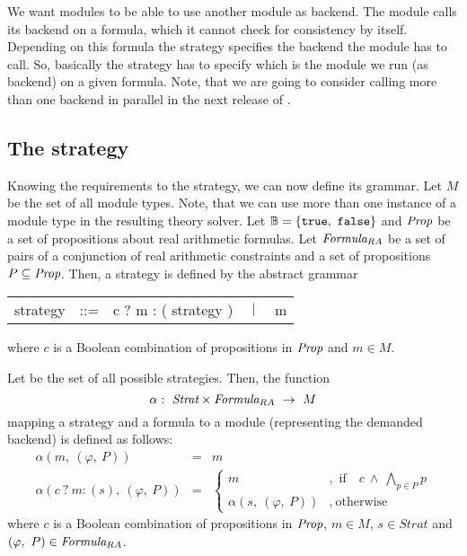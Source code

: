 We want modules to be able to use another module as backend. The module calls its backend 
on a formula, which it cannot check for consistency by itself. Depending on this formula the strategy
specifies the backend the module has to call. So, basically the strategy has to specify
which is the module we run (as backend) on a given formula. Note, that we are going to consider
calling more than one backend in parallel in the next release of \smtrat.
 
\subsection{The strategy}
Knowing the requirements to the strategy, we can now define its grammar. 
Let $M$ be the set of all module types. Note, that we can use
more than one instance of a module type in the resulting theory solver. Let
$\mathbb{B}=\{\texttt{true},\ \texttt{false}\}$ and $\textit{Prop}$ be a set of propositions about real
arithmetic formulas. Let $\textit{Formula}_{RA}$ be a set of pairs of a conjunction of real
arithmetic constraints and a set of propositions $P\subseteq \textit{Prop}$. 
Then, a strategy is defined by the abstract grammar
\begin{center}
\begin{tabular}{cclcl}
	strategy & ::= & c ? m : ( strategy ) & $~\mid~$ & m
\end{tabular}
\end{center}
where $c$ is a Boolean combination of propositions in $\textit{Prop}$ and $m\in M$. 

Let \strategy be the set of all possible strategies. Then, the function 
$$\alpha:\ \strategy\times \formula \ \rightarrow\ M$$ mapping a strategy
and a formula to a module (representing the demanded backend) is
defined as follows:
$$\begin{array}{lcl}
	\alpha(m,\ (\varphi,\ P)) & = & m \\[2ex]
	\alpha(c\ ?\ m : (s),\ (\varphi,\ P)) & = & \left\{\begin{array}{ll} m &,\text{ if}\quad c\ \land\ \bigwedge\limits_{p\in P}p\\[1ex] \alpha(s,\ (\varphi,\ P))& ,\ \text{otherwise} \end{array}\right.
\end{array}$$
where $c$ is a Boolean combination of propositions in $\textit{Prop}$, $m\in M$, $s\in Strat$ and
$(\varphi,\ P)\in \textit{Formula}_{RA}$.

